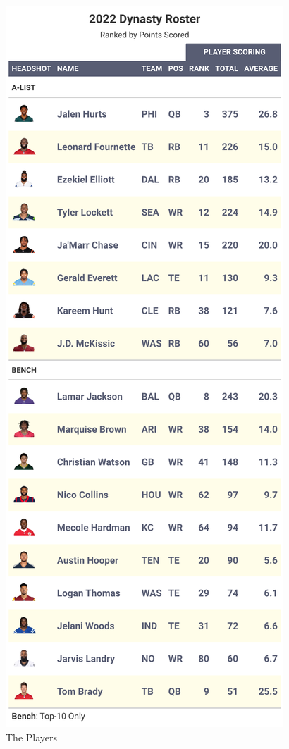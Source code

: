 \documentclass[
]{article}
\begin{document}
\begin{figure}
\includegraphics[width=0.75\linewidth,height=0.75\textheight]{output/2022/dynasty_roster_Naaderbanki} \caption{The Players}\label{fig:unnamed-chunk-9}
\end{figure}
\newpage
\end{document}
